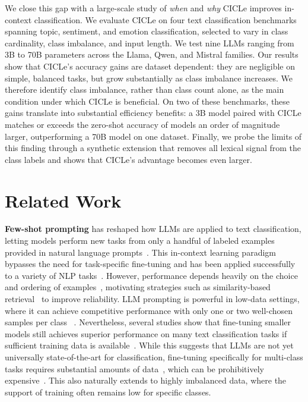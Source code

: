 \documentclass[runningheads]{llncs}
\begin{document}
We close this gap with a large-scale study of \emph{when} and \emph{why} CICLe improves in-context classification. We evaluate CICLe on four text classification benchmarks spanning topic, sentiment, and emotion classification, selected to vary in class cardinality, class imbalance, and input length. We test nine LLMs ranging from 3B to 70B parameters across the Llama, Qwen, and Mistral families. Our results show that CICLe's accuracy gains are dataset dependent: they are negligible on simple, balanced tasks, but grow substantially as class imbalance increases. We therefore identify class imbalance, rather than class count alone, as the main condition under which CICLe is beneficial. On two of these benchmarks, these gains translate into substantial efficiency benefits: a 3B model paired with CICLe matches or exceeds the zero-shot accuracy of models an order of magnitude larger, outperforming a 70B model on one dataset. Finally, we probe the limits of this finding through a synthetic extension that removes all lexical signal from the class labels and shows that CICLe's advantage becomes even larger.
%
%
\section{Related Work}
%
\textbf{Few-shot prompting} has reshaped how LLMs are applied to text classification, letting models perform new tasks from only a handful of labeled examples provided in natural language prompts~\cite{brown2020language}. This in-context learning paradigm bypasses the need for task-specific fine-tuning and has been applied successfully to a variety of NLP tasks~\cite{gao2021making}. However,
performance depends heavily on the choice and ordering of examples~\cite{lu2022fantastically}, motivating strategies such as
similarity-based retrieval~\cite{rubin2022learning} to improve
reliability. LLM prompting is powerful in low-data settings, where it can achieve competitive performance with only one or two well-chosen samples per class ~\cite{brown2020language,edwards2024language}. Nevertheless, several studies show that fine-tuning smaller models still achieves superior performance on many text classification tasks if sufficient training data is available~\cite{bucher2024fine,edwards2024language}.
While this suggests that LLMs are not yet universally state-of-the-art for
classification, fine-tuning specifically for multi-class tasks requires substantial amounts of data~\cite{edwards2024language}, which can be prohibitively expensive~\cite{edwards2024language,snow2008cheap}.
This also naturally extends to highly imbalanced data, where the support of training often remains low for specific classes.
\end{document}
